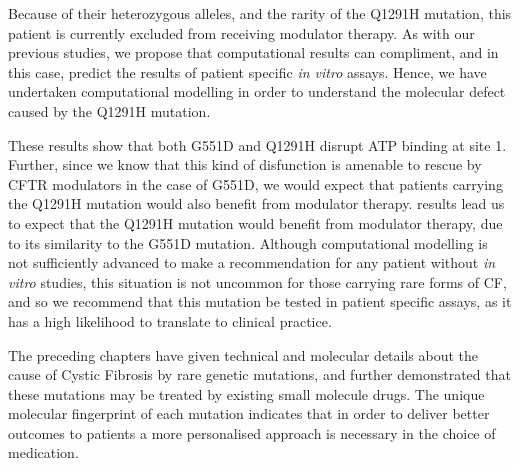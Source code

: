 Because of their heterozygous alleles, and the rarity of the Q1291H mutation, this patient is currently excluded from receiving modulator therapy. As with our previous studies, we propose that computational results can compliment, and in this case, predict the results of patient specific \textit{in vitro} assays. Hence, we have undertaken computational modelling in order to understand the molecular defect caused by the Q1291H mutation. 

These results show that both G551D and Q1291H disrupt ATP binding at site 1. Further, since we know  that this kind of disfunction is amenable to rescue by CFTR modulators in the case of G551D, we would expect that patients carrying the Q1291H mutation would also benefit from modulator therapy.  results lead us to expect that the Q1291H mutation would benefit from modulator therapy, due to its similarity to the G551D mutation. Although computational modelling is not sufficiently advanced to make a recommendation for any patient without \textit{in vitro} studies, this situation is not uncommon for those carrying rare forms of CF, and so we recommend that this mutation be tested in patient specific assays, as it has a high likelihood to translate to clinical practice.


The preceding chapters have given technical and molecular details about the cause of Cystic Fibrosis by rare genetic mutations, and further demonstrated that these mutations may be treated by existing small molecule drugs. The unique molecular fingerprint of each mutation indicates that in order to deliver better outcomes to patients a more personalised approach is necessary in the choice of medication. 






